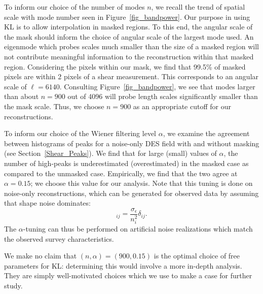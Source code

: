 To inform our choice of the number of modes $n$, we recall the trend of 
spatial scale with mode number seen in Figure~\ref{fig_bandpower}.  Our 
purpose in using KL is to allow interpolation in masked regions.  To this 
end, the angular scale of the mask should inform the choice of angular
scale of the largest mode used.  An eigenmode which probes scales much smaller
than the size of a masked region will not contribute meaningful information to
the reconstruction within that masked region.  Considering the pixels within
our mask, we find that 99.5\% of masked pixels are within 2 pixels of a
shear measurement.  This corresponds to an angular scale of $\ell=6140$.
Consulting Figure~\ref{fig_bandpower}, we see that modes larger than
about $n=900$ out of 4096 will probe length scales significantly 
smaller than the mask scale.  
Thus, we choose $n=900$ as an appropriate cutoff for our reconstructions.

To inform our choice of the Wiener filtering level $\alpha$, we examine the
agreement between histograms of \Map peaks for a noise-only DES field
with and without masking (see Section~\ref{Shear_Peaks}).  
We find that for large (small) values of $\alpha$, the number
of high-\Map peaks is underestimated (overestimated) in the masked 
case as compared to the unmasked case.  
Empirically, we find that the two agree at $\alpha = 0.15$; 
we choose this value for our analysis.  Note that this 
tuning is done on noise-only reconstructions, 
which can be generated for observed data by assuming that
shape noise dominates: 
\begin{equation}
  [\Noise_\gamma]_{ij} = \frac{\sigma_\epsilon}{n_i^2}\delta_{ij}.
\end{equation}
The $\alpha$-tuning can thus be performed on artificial noise realizations 
which match the observed survey characteristics.

We make no claim that $(n,\alpha) = (900,0.15)$ is the optimal
choice of free parameters for KL: determining this would involve a more
in-depth analysis.  They are simply well-motivated choices which we use to
make a case for further study.

